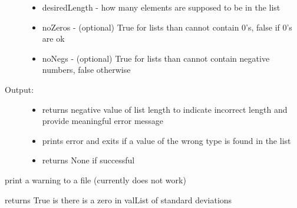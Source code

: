 \documentclass[letterpaper,10pt,english]{sphinxmanual}
\begin{document}
\begin{fulllineitems}
\begin{fulllineitems}
\begin{description}
\begin{itemize}
\item {} 
desiredLength - how many elements are supposed to be in the list

\item {} 
noZeros - (optional) True for lists than cannot contain 0's, false if 0's are ok

\item {} 
noNegs - (optional) True for lists than cannot contain negative numbers, false otherwise

\end{itemize}

\item[{Output:}] \leavevmode\begin{itemize}
\item {} 
returns negative value of list length to indicate incorrect length and provide meaningful error message

\item {} 
prints error and exits if a value of the wrong type is found in the list

\item {} 
returns None if successful

\end{itemize}

\end{description}

\end{fulllineitems}


\begin{fulllineitems}
\label{pydfnworks:pydfnworks.helper.input_helper.warning}
print a warning to a file (currently does not work)

\end{fulllineitems}


\begin{fulllineitems}
\label{pydfnworks:pydfnworks.helper.input_helper.zero_in_std_devs}
returns True is there is a zero in valList of standard deviations

\end{fulllineitems}


\end{fulllineitems}
\end{document}
